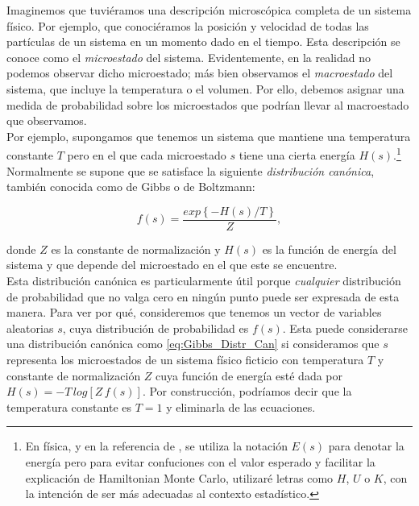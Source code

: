  Imaginemos que tuviéramos una descripción microscópica completa de un sistema físico. Por ejemplo, que conociéramos la posición y velocidad de todas las partículas de un sistema en un momento dado en el tiempo. Esta descripción se conoce como el \textit{microestado} del sistema. Evidentemente, en la realidad no podemos observar dicho microestado; más bien observamos el \textit{macroestado} del sistema, que incluye la temperatura o el volumen. Por ello, debemos asignar una medida de probabilidad sobre los microestados que podrían llevar al macroestado que observamos.\\ 
 
 Por ejemplo, supongamos que tenemos un sistema que mantiene una temperatura constante $T$ pero en el que cada microestado $s$ tiene una cierta energía $H(s)$.\footnote{En física, y en la referencia de \textcite{Neal93}, se utiliza la notación $E(s)$ para denotar la energía pero para evitar confuciones con el valor esperado y facilitar la explicación de Hamiltonian Monte Carlo, utilizaré letras como $H$, $U$ o $K$, con la intención de ser más adecuadas al contexto estadístico.} Normalmente se supone que se satisface la siguiente \textit{distribución canónica}, también conocida como de Gibbs o de Boltzmann: 
 
\begin{equation}
\label{eq:Gibbs_Distr_Can}
 f(s) = \dfrac{exp\left\lbrace-H(s)/T\right\rbrace}{Z},
\end{equation}
 
 donde $Z$ es la constante de normalización y $H(s)$ es la función de energía del sistema y que depende del microestado en el que este se encuentre.\\
 
 Esta distribución canónica es particularmente útil porque \textit{cualquier} distribución de probabilidad que no valga cero en ningún punto puede ser expresada de esta manera. Para ver por qué, consideremos que tenemos un vector de variables aleatorias $s$, cuya distribución de probabilidad es $f(s)$. Esta puede considerarse una distribución canónica como \eqref{eq:Gibbs_Distr_Can} si consideramos que $s$ representa los microestados de un sistema físico ficticio con temperatura $T$ y constante de normalización $Z$ cuya función de energía esté dada por $H(s) = -T\,log\left[Z\,f(s)\right]$. Por construcción, podríamos decir que la temperatura constante es $T=1$ y eliminarla de las ecuaciones.\\ 
 
